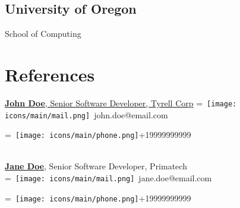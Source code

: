 \documentclass[]{plushcv}
\begin{document}
\begin{minipage}[t]{0.25\textwidth}
        \sectionsep
        \subsection{University of Oregon}
        School of Computing \\
        \sectionsep


        \section{References}
        \href{https://www.linkedin.com/company/john-doe/}{\textbf{John Doe}, Senior Software Developer, Tyrell Corp}
        \begingroup
        =\hbox{
            \texttt{[image: icons/main/mail.png]}\hspace{0.3cm} john.doe@email.com
        }
        \parbox{\wd0}{}
        \endgroup
        \begingroup
        =\hbox{
            \texttt{[image: icons/main/phone.png]}\hspace{0.3cm}+19999999999
        }
        \parbox{\wd0}{}\endgroup
        \\
        \sectionsep
        \href{https://www.linkedin.com/company/john-doe/}{\textbf{Jane Doe}}, Senior Software Developer, Primatech
        \\
        \begingroup
        =\hbox{
            \texttt{[image: icons/main/mail.png]}\hspace{0.3cm} jane.doe@email.com
        }
        \parbox{\wd0}{}
        \endgroup
        \begingroup
        =\hbox{
            \texttt{[image: icons/main/phone.png]}\hspace{0.3cm}+19999999999
        }
        \parbox{\wd0}{}\endgroup
        \\




\end{minipage}
\end{document}
